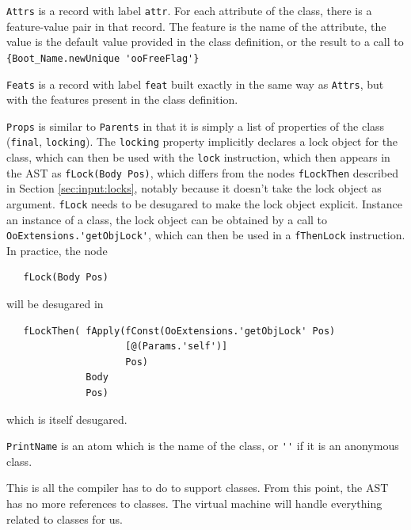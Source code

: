 \documentclass[a4paper]{memoir}
\begin{document}
\lstinline!Attrs! is a record with label \lstinline!attr!.
For each attribute of the class, there is a feature-value pair in that record.
The feature is the name of the attribute, the value is the default value
provided in the class definition, or the result to a call to
\lstinline!{Boot_Name.newUnique 'ooFreeFlag'}!

\lstinline!Feats! is a record with label \lstinline!feat! built exactly in the
same way as \lstinline!Attrs!, but with the features present in the class
definition.

\lstinline!Props! is similar to \lstinline!Parents! in that it is simply a list of properties of the class (\lstinline!final!,
\lstinline!locking!). The \lstinline!locking! property implicitly declares a
lock object for the class, which can then be used with the \lstinline!lock!
instruction, which then appears in the AST as \lstinline!fLock(Body Pos)!, which
differs from the nodes \lstinline!fLockThen! described in Section
\ref{sec:input:locks}, notably because it doesn't take the lock object as
argument. \lstinline!fLock!
needs to be desugared to make the lock object explicit. Instance an instance of
a class, the lock object can be obtained by a call to
\lstinline!OoExtensions.'getObjLock'!, which can then be used in a
\lstinline!fThenLock! instruction. In practice, the node
\label{desugar:classes:lock}
\begin{lstlisting}
   fLock(Body Pos)
\end{lstlisting}

will be desugared in 

\begin{lstlisting}
   fLockThen( fApply(fConst(OoExtensions.'getObjLock' Pos) 
                     [@(Params.'self')] 
                     Pos)
              Body 
              Pos)  
\end{lstlisting}
which is itself desugared.

\lstinline!PrintName! is an atom which is the name of the class, or \lstinline!''! if it is
an anonymous class.

This is all the compiler has to do to support classes. From this point, the AST
has no more references to classes. The virtual machine will handle everything related to classes for us.
\end{document}

